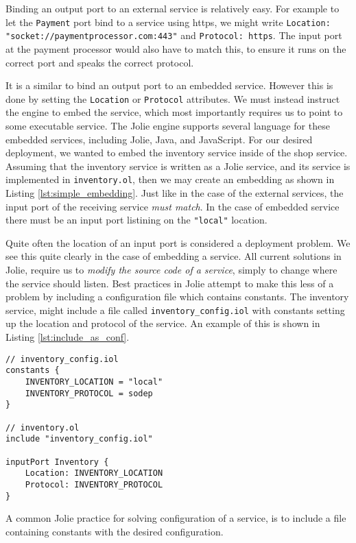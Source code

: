 Binding an output port to an external service is relatively easy. For example
to let the \verb!Payment! port bind to a service using https, we might write
\texttt{Location: "socket://paymentprocessor.com:443"} and
\texttt{Protocol: https}. The input port at the payment processor
would also have to match this, to ensure it runs on the correct port and speaks
the correct protocol.

It is a similar to bind an output port to an embedded service. However this is
done by setting the \texttt{Location} or \texttt{Protocol}
attributes. We must instead instruct the engine to embed the service, which
most importantly requires us to point to some executable service. The Jolie
engine supports several language for these embedded services, including Jolie,
Java, and JavaScript. For our desired deployment, we wanted to embed the
inventory service inside of the shop service. Assuming that the inventory
service is written as a Jolie service, and its service is implemented in
\texttt{inventory.ol}, then we may create an embedding as shown in
Listing \ref{lst:simple_embedding}. Just like in the case of the external
services, the input port of the receiving service \emph{must match}. In the
case of embedded service there must be an input port listining on the
\texttt{"local"} location.

Quite often the location of an input port is considered a deployment problem.
We see this quite clearly in the case of embedding a service. All current
solutions in Jolie, require us to \emph{modify the source code of a service},
simply to change where the service should listen. Best practices in Jolie
attempt to make this less of a problem by including a configuration file which
contains constants. The inventory service, might include a file called
\verb!inventory_config.iol! with constants setting up the location and protocol
of the service. An example of this is shown in Listing
\ref{lst:include_as_conf}.

\begin{listing}[H]
\begin{verbatim}
// inventory_config.iol
constants {
    INVENTORY_LOCATION = "local"
    INVENTORY_PROTOCOL = sodep
}

// inventory.ol
include "inventory_config.iol"

inputPort Inventory {
    Location: INVENTORY_LOCATION
    Protocol: INVENTORY_PROTOCOL
}
\end{verbatim}

\caption{A common Jolie practice for solving configuration of a service, is to
    include a file containing constants with the desired configuration.}

\label{lst:include_as_conf}

\end{listing}

